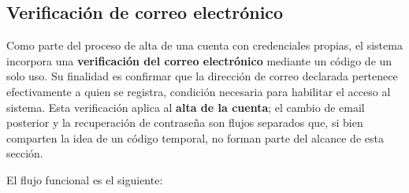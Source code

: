 \documentclass[a4paper,12pt]{article}
\begin{document}
    \subsection{Verificación de correo electrónico}
    \par Como parte del proceso de alta de una cuenta con credenciales propias, el sistema incorpora una \textbf{verificación del correo electrónico} mediante un código de un solo uso. Su finalidad es confirmar que la dirección de correo declarada pertenece efectivamente a quien se registra, condición necesaria para habilitar el acceso al sistema. Esta verificación aplica al \textbf{alta de la cuenta}; el cambio de email posterior y la recuperación de contraseña son flujos separados que, si bien comparten la idea de un código temporal, no forman parte del alcance de esta sección.
    \par El flujo funcional es el siguiente:
\end{document}
